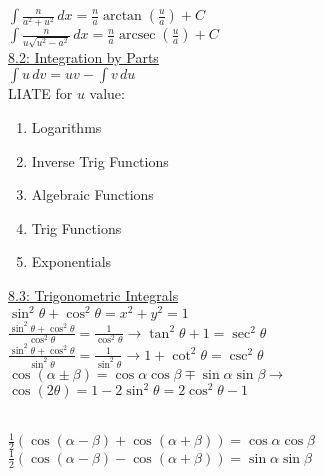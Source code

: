 \documentclass[10pt,a5paper]{report}
\DeclareMathOperator{\arcsec}{arcsec}
\begin{document}
\begin{multicols*}{2}
	$\int{\frac{n}{a^{2}+u^{2}}}\,dx=\frac{n}{a}\arctan{\left(\frac{u}{a}\right)}+C$ \\
	
	$\int{\frac{n}{u\sqrt{u^{2}-a^{2}}}}\,dx=\frac{n}{a}\arcsec{\left(\frac{u}{a}\right)}+C$ \\
	
	\underline{8.2: Integration by Parts} \\
	
	$\int{u}\,dv=uv-\int{v}\,du$ \\
	
	LIATE for $u$ value: 
	\begin{enumerate}
		\item{Logarithms}
		\item{Inverse Trig Functions}
		\item{Algebraic Functions}
		\item{Trig Functions}
		\item{Exponentials} \\
	\end{enumerate}
	
	\underline{8.3: Trigonometric Integrals} \\
	
	$ \sin^{2}{\theta}+\cos^{2}{\theta}=x^{2}+y^{2}=1$ \\
	
	$ \frac{\sin^{2}{\theta}+\cos^{2}{\theta}}{\cos^{2}{\theta}}=\frac{1}{\cos^{2}{\theta}}\rightarrow
	   \tan^{2}{\theta}+1=\sec^{2}{\theta}$ \\
	   
	$ \frac{\sin^{2}{\theta}+\cos^{2}{\theta}}{\sin^{2}{\theta}}=\frac{1}{\sin^{2}{\theta}}\rightarrow
	   1+\cot^{2}{\theta}=\csc^{2}{\theta}$ \\
	   
	$ \cos{\left(\alpha\pm\beta\right)}=\cos{\alpha}\cos{\beta}\mp\sin{\alpha}\sin{\beta}\rightarrow$ \\
	
	$\cos{\left(2\theta\right)}=1-2\sin^{2}{\theta}=2\cos^{2}{\theta}-1$ \\\

	$ \frac{1}{2}\left(\cos{\left(\alpha-\beta\right)}+\cos{\left(\alpha+\beta\right)}\right)=
	   \cos{\alpha}\cos{\beta}$ \\
	   
	$ \frac{1}{2}\left(\cos{\left(\alpha-\beta\right)}-\cos{\left(\alpha+\beta\right)}\right)=
	   \sin{\alpha}\sin{\beta}$ \\
	   

\end{multicols*}
\end{document}

